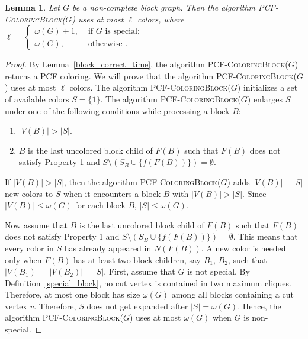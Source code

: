 \documentclass[11pt]{article}
\theoremstyle{plain}
\newtheorem{lemma}{Lemma}
\begin{document}
	\begin{lemma}\label{block_optimal}
		Let $G$ be a non-complete block graph. Then the algorithm \textsc{PCF-ColoringBlock($G$)} uses at most $\ell$ colors, where $\ell =  \begin{cases} 
			\omega(G)+1, & \text{ if } G \text{ is special;} \\
			\omega(G), & \text{ otherwise }.
		\end{cases}$
	\end{lemma}
	\begin{proof}
		By Lemma~\ref{block_correct_time}, the algorithm \textsc{PCF-ColoringBlock($G$)} returns a PCF coloring. We will prove that the algorithm \textsc{PCF-ColoringBlock($G$)} uses at most $\ell$ colors.
		The algorithm \textsc{PCF-ColoringBlock($G$)} initializes a set of available colors $S=\{1\}$. The algorithm \textsc{PCF-ColoringBlock($G$)} enlarges $S$ under one of the following conditions while processing a block $B$:
		
		\begin{enumerate}
			\item $|V(B)|>|S|$.
			
			\item $B$ is the last uncolored block child of $F(B)$ such that $F(B)$ does not satisfy \textsf{Property 1} and $S\setminus (S_{B}\cup\{f(F(B))\}) = \emptyset$.
		\end{enumerate}
		
		If $|V(B)|>|S|$, then the algorithm \textsc{PCF-ColoringBlock($G$)} adds $|V(B)|-|S|$ new colors to $S$ when it encounters a block $B$ with $|V(B)|>|S|$. Since $|V(B)|\leq\omega(G)$ for each block $B$, $|S|\leq\omega(G)$. 
		
		\medskip
		
		Now assume that $B$ is the last uncolored block child of $F(B)$ such that $F(B)$ does not satisfy \textsf{Property 1} and $S\setminus (S_{B}\cup\{f(F(B))\}) = \emptyset$.
		This means that every color in $S$ has already appeared in $N(F(B))$.
		A new color is needed only when $F(B)$ has at least two block children, say $B_1$, $B_2$, such that $|V(B_1)| = |V(B_2)| = |S|$. First, assume that $G$ is not special. By Definition~\ref{special_block}, no cut vertex is contained in two maximum cliques. Therefore, at most one block has size $\omega(G)$ among all blocks containing a cut vertex $v$.
		Therefore, $S$ does not get expanded after $|S|=\omega(G)$.
		Hence, the algorithm \textsc{PCF-ColoringBlock($G$)} uses at most $\omega(G)$ when $G$ is non-special. 
		

\end{proof}
\end{document}
